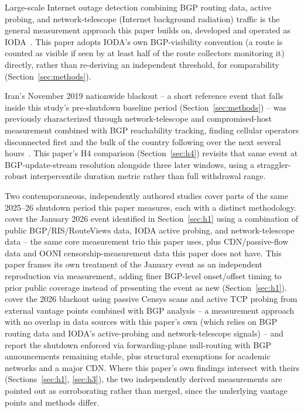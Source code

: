Large-scale Internet outage detection combining BGP routing data, active
probing, and network-telescope (Internet background radiation) traffic is
the general measurement approach this paper builds on, developed and
operated as IODA~\citep{alcock2024ioda}. This paper adopts IODA's own
BGP-visibility convention (a route is counted as visible if seen by at
least half of the route collectors monitoring it) directly, rather than
re-deriving an independent threshold, for comparability
(Section~\ref{sec:methods}).

Iran's November 2019 nationwide blackout -- a short reference event that
falls inside this study's pre-shutdown baseline period (Section~\ref{sec:methods})
-- was previously characterized through network-telescope and
compromised-host measurement combined with
BGP reachability tracking,
finding cellular operators disconnected first and the bulk of the country
following over the next several
hours~\citep{mangino2021multidimensional}. This paper's H4 comparison
(Section~\ref{sec:h4}) revisits that same event at BGP-update-stream
resolution alongside three later windows, using a straggler-robust
interpercentile duration metric rather than full withdrawal range.

Two contemporaneous, independently authored studies cover parts of the
same 2025--26 shutdown period this paper measures, each with a distinct
methodology. \citet{aceto2026iran} cover the January 2026 event identified
in Section~\ref{sec:h1} using a combination of public BGP/RIS/RouteViews
data, IODA active probing, and network-telescope data -- the same core
measurement trio this paper uses, plus CDN/passive-flow data and OONI
censorship-measurement data this paper does not have. This paper
frames its own treatment of the January event as an independent
reproduction via measurement, adding finer BGP-level onset/offset timing to
prior public coverage instead of presenting the event as new
(Section~\ref{sec:h1}).
\citet{jahromi2026multiperspective} cover the 2026 blackout using passive
Censys scans and active TCP probing from external vantage points combined
with BGP analysis -- a measurement approach with no overlap in data
sources with this paper's own (which relies on BGP routing data and
IODA's active-probing and network-telescope signals) -- and report the shutdown enforced
via forwarding-plane null-routing with BGP announcements remaining stable,
plus structural exemptions for academic networks and a major CDN. Where
this paper's own findings intersect with theirs (Sections~\ref{sec:h1},
\ref{sec:h3}), the two independently derived measurements are pointed out
as corroborating rather than merged, since the underlying vantage points
and methods differ.

